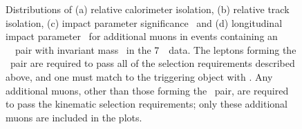 \begin{figure}[h]
\centering
    \caption[ Distributions of relative track and calorimeter isolation, \dzerosig\
    and \zzero\ for additional muons in events containing a dilepton pair with mass
    \sstooos\ in 7~\tev\ data.]
    {Distributions of (a) relative calorimeter isolation,
    (b) relative track isolation, (c) impact parameter significance \dzerosig\ and
    (d) longitudinal impact parameter \zzero\ for additional muons
    in events containing an \ossf\ \dilepton\ pair with invariant mass \sstooos\
    in the 7~\tev\ data.
    The leptons forming the \dilepton\ pair are required to pass all of the
    selection requirements described above, and one must match to the triggering
    object with \ptgt{25}. Any additional muons, other than those forming the
    \dilepton\ pair, are required to pass the kinematic selection requirements; only
    these additional muons are included in the plots.}
\label{fig:objsel-mu}
\end{figure}
